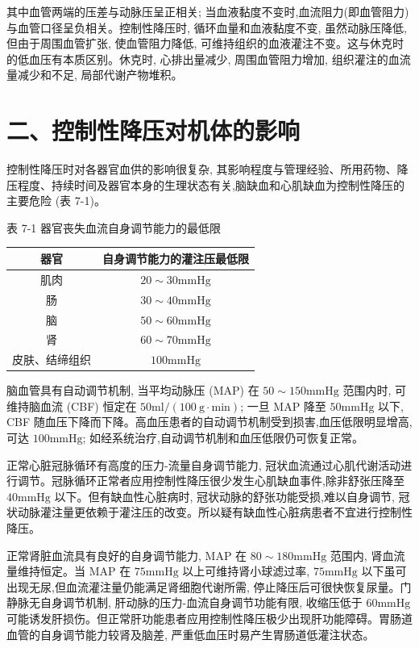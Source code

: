 \documentclass[10pt]{article}
\begin{document}
其中血管两端的压差与动脉压呈正相关; 当血液黏度不变时,血流阻力(即血管阻力) 与血管口径呈负相关。控制性降压时, 循环血量和血液黏度不变, 虽然动脉压降低, 但由于周围血管扩张, 使血管阻力降低, 可维持组织的血液灌注不变。这与休克时的低血压有本质区别。休克时, 心排出量减少, 周围血管阻力增加, 组织灌注的血流量减少和不足, 局部代谢产物堆积。

\section*{二、控制性降压对机体的影响}
控制性降压时对各器官血供的影响很复杂, 其影响程度与管理经验、所用药物、降压程度、持续时间及器官本身的生理状态有关,脑缺血和心肌缺血为控制性降压的主要危险 (表 7-1)。

表 7-1 器官丧失血流自身调节能力的最低限

\begin{center}
\begin{tabular}{cc}
\hline
器官 & 自身调节能力的灌注压最低限 \\
\hline
肌肉 & $20 \sim 30 \mathrm{mmHg}$ \\
肠 & $30 \sim 40 \mathrm{mmHg}$ \\
脑 & $50 \sim 60 \mathrm{mmHg}$ \\
肾 & $60 \sim 70 \mathrm{mmHg}$ \\
皮肤、结缔组织 & $100 \mathrm{mmHg}$ \\
\hline
\end{tabular}
\end{center}

脑血管具有自动调节机制, 当平均动脉压 (MAP) 在 $50 \sim 150 \mathrm{mmHg}$ 范围内时, 可维持脑血流 (CBF) 恒定在 $50 \mathrm{ml} /(100 \mathrm{~g} \cdot \mathrm{min})$; 一旦 MAP 降至 $50 \mathrm{mmHg}$ 以下, CBF 随血压下降而下降。高血压患者的自动调节机制受到损害,血压低限明显增高,可达 $100 \mathrm{mmHg}$; 如经系统治疗,自动调节机制和血压低限仍可恢复正常。

正常心脏冠脉循环有高度的压力-流量自身调节能力, 冠状血流通过心肌代谢活动进行调节。冠脉循环正常者应用控制性降压很少发生心肌缺血事件,除非舒张压降至 $40 \mathrm{mmHg}$ 以下。但有缺血性心脏病时, 冠状动脉的舒张功能受损,难以自身调节, 冠状动脉灌注量更依赖于灌注压的改变。所以疑有缺血性心脏病患者不宜进行控制性降压。

正常肾脏血流具有良好的自身调节能力, MAP 在 $80 \sim 180 \mathrm{mmHg}$ 范围内, 肾血流量维持恒定。当 MAP 在 $75 \mathrm{mmHg}$ 以上可维持肾小球滤过率, $75 \mathrm{mmHg}$ 以下虽可出现无尿,但血流灌注量仍能满足肾细胞代谢所需, 停止降压后可很快恢复尿量。门静脉无自身调节机制, 肝动脉的压力-血流自身调节功能有限, 收缩压低于 $60 \mathrm{mmHg}$ 可能诱发肝损伤。但正常肝功能患者应用控制性降压极少出现肝功能障碍。胃肠道血管的自身调节能力较肾及脑差, 严重低血压时易产生胃肠道低灌注状态。
\end{document}
